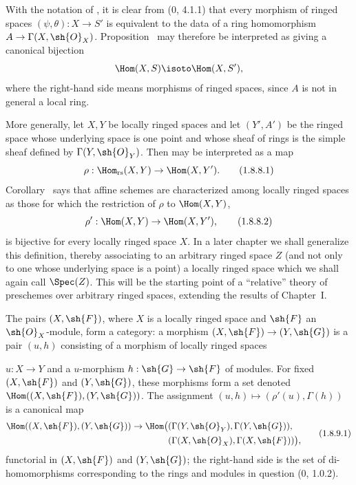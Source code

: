 \begin{env}[1.8.8]
\label{I.1.8.8}
With the notation of , it is clear from (0, 4.1.1) that
every morphism of ringed spaces $(\psi,\theta):X\to S'$ is equivalent
to the data of a ring homomorphism
$A\to\Gamma(X,\sh{O}_X)$.  Proposition~ may therefore
be interpreted as giving a canonical bijection
\[
  \Hom(X,S)\isoto\Hom(X,S'),
\]
where the right-hand side means morphisms of ringed spaces, since $A$
is not in general a local ring.

More generally, let $X,Y$ be locally ringed spaces and let $(Y',A')$
be the ringed space whose underlying space is one point and whose
sheaf of rings is the simple sheaf defined by
$\Gamma(Y,\sh{O}_Y)$.  Then  may be interpreted as a
map
\begin{equation}
\label{I.1.8.8.1}
  \rho:\Hom_{\mathrm{rs}}(X,Y)\to\Hom(X,Y').
\tag{1.8.8.1}
\end{equation}
Corollary~ says that affine schemes are characterized
among locally ringed spaces as those for which the restriction of
$\rho$ to $\Hom(X,Y)$,
\begin{equation}
\label{I.1.8.8.2}
  \rho':\Hom(X,Y)\to\Hom(X,Y'),
\tag{1.8.8.2}
\end{equation}
is bijective for every locally ringed space $X$.  In a later chapter
we shall generalize this definition, thereby associating to an
arbitrary ringed space $Z$ (and not only to one whose underlying
space is a point) a locally ringed space which we shall again call
$\Spec(Z)$.  This will be the starting point of a ``relative'' theory
of preschemes over arbitrary ringed spaces, extending the results of
Chapter~I.
\end{env}

\begin{env}[1.8.9]
\label{I.1.8.9}
The pairs $(X,\sh{F})$, where $X$ is a locally ringed space and
$\sh{F}$ an $\sh{O}_X$-module, form a category: a morphism
$(X,\sh{F})\to(Y,\sh{G})$ is a pair $(u,h)$ consisting of a morphism
of locally ringed spaces

$u:X\to Y$ and a $u$-morphism $h:\sh{G}\to\sh{F}$ of modules.  For
fixed $(X,\sh{F})$ and $(Y,\sh{G})$, these morphisms form a set denoted
$\Hom((X,\sh{F}),(Y,\sh{G}))$.  The assignment
$(u,h)\mapsto(\rho'(u),\Gamma(h))$ is a canonical map
\begin{equation}
\label{I.1.8.9.1}
\begin{split}
  \Hom((X,\sh{F}),(Y,\sh{G}))\to
  \Hom\bigl(
    &(\Gamma(Y,\sh{O}_Y),\Gamma(Y,\sh{G})),\\
    &(\Gamma(X,\sh{O}_X),\Gamma(X,\sh{F}))
  \bigr),
\end{split}
\tag{1.8.9.1}
\end{equation}
functorial in $(X,\sh{F})$ and $(Y,\sh{G})$; the right-hand side is
the set of di-homomorphisms corresponding to the rings and modules in
question (0, 1.0.2).
\end{env}

